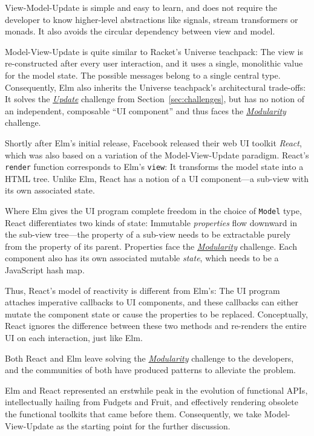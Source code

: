 \documentclass[sigplan,review,screen]{acmart}
\begin{document}
View-Model-Update is simple and easy to
learn, and does not require the developer to know higher-level
abstractions like signals, stream transformers or monads.  It also
avoids the circular dependency between view and model.

Model-View-Update is quite similar to Racket's
Universe teachpack: The view is re-constructed after every user
interaction, and it uses a single, monolithic value for the model
state.  The possible messages belong to a
single central type.
Consequently, Elm also inherits the Universe teachpack's architectural
trade-offs: It solves the \hyperlink{challenge:update}{\textit{Update}} challenge from Section~\ref{sec:challenges},
but has no notion of an
independent, composable ``UI component'' and thus faces the
\hyperlink{challenge:modularity}{\textit{Modularity}} challenge.

Shortly after Elm's initial release, Facebook released their web UI
toolkit \textit{React}, which was also based on a variation of the
Model-View-Update paradigm.
React's \texttt{render} function corresponds to Elm's \texttt{view}:
It transforms the model state into a HTML tree.  Unlike Elm,
React has a notion of a UI component---a sub-view with its
own associated state.

Where Elm gives the UI program complete freedom in the choice of
\texttt{Model} type, React differentiates two kinds of state:
Immutable \textit{properties} flow downward in the sub-view
tree---the property of a sub-view needs to be extractable purely from the
property of its parent.  Properties face the
\hyperlink{challenge:modularity}{\textit{Modularity}} challenge.
Each component also has its own associated mutable \textit{state},
which needs to be a JavaScript hash map.

Thus, React's model of reactivity is different from Elm's: The UI
program attaches imperative callbacks to UI components, and these
callbacks can either mutate the component state or cause the
properties to be replaced.  Conceptually, React ignores the difference
between these two methods and re-renders the entire UI on each
interaction, just like Elm.

Both React and Elm leave solving the
\hyperlink{challenge:modularity}{\textit{Modularity}} challenge to the
developers, and the communities of both have produced patterns to
alleviate the problem.


Elm and React represented an erstwhile peak in the evolution of
functional APIs, intellectually hailing from Fudgets and Fruit, and
effectively rendering obsolete the functional toolkits that came
before them.
Consequently, we
take Model-View-Update as the starting point for the further
discussion.
\end{document}
